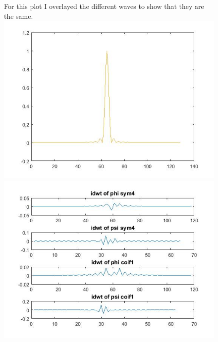 \documentclass{article}
\begin{document}
\begin{figure}[H]
	For this plot I overlayed the different waves to show that they are the same.
  \includegraphics[scale=.5]{4_same}
  \includegraphics[scale=.5]{4_idwt}
  \end{figure}
  
  
  
  
  
\end{document}
